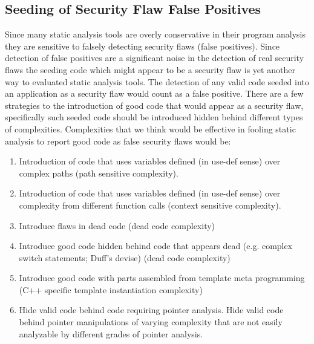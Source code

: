 \subsection{Seeding of Security Flaw False Positives}
         \label{sec:FalsePositiveEvaluation}
         Since many static analysis tools are overly conservative in their program
         analysis they are sensitive to falsely detecting security flaws (false
         positives). Since detection of false positives are a significant noise
         in the detection of real security flaws the seeding code which might
         appear to be a security flaw is yet another way to evaluated static 
         analysis tools.  The detection of any valid code seeded into an 
         application as a security flaw would count as a false positive.
         There are a few strategies to the introduction of good code that
         would appear as a security flaw, specifically such seeded code
         should be introduced hidden behind different types of complexities.
         Complexities that we think would be effective in fooling static analysis
         to report good code as false security flaws would be:
         \begin{enumerate}
            \item Introduction of code that uses variables defined (in use-def sense) over
            complex paths (path sensitive complexity).
            \item Introduction of code that uses variables defined (in use-def sense) over
            complexity from different function calls (context sensitive complexity).
            \item Introduce flaws in dead code (dead code complexity)
            \item Introduce good code hidden behind code that appears dead (e.g. complex switch
            statements; Duff's devise) (dead code complexity)
            \item Introduce good code with parts assembled from template meta programming (C++
            specific template instantiation complexity)
            \item Hide valid code behind code requiring pointer analysis. 
            Hide valid code behind pointer manipulations of varying complexity that are
            not easily analyzable by different grades of pointer analysis.
         \end{enumerate}




